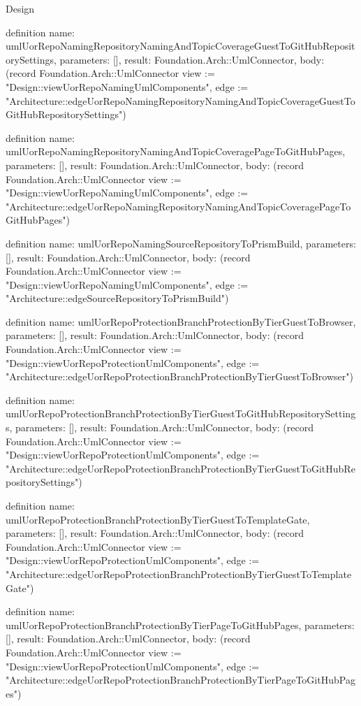 \begin{lexlean}{Design}
\begin{semanticmodule}
definition{
  name: umlUorRepoNamingRepositoryNamingAndTopicCoverageGuestToGitHubRepositorySettings,
  parameters: [],
  result: Foundation.Arch::UmlConnector,
  body: (record Foundation.Arch::UmlConnector {view := "Design::viewUorRepoNamingUmlComponents", edge := "Architecture::edgeUorRepoNamingRepositoryNamingAndTopicCoverageGuestToGitHubRepositorySettings"})
}

definition{
  name: umlUorRepoNamingRepositoryNamingAndTopicCoveragePageToGitHubPages,
  parameters: [],
  result: Foundation.Arch::UmlConnector,
  body: (record Foundation.Arch::UmlConnector {view := "Design::viewUorRepoNamingUmlComponents", edge := "Architecture::edgeUorRepoNamingRepositoryNamingAndTopicCoveragePageToGitHubPages"})
}

definition{
  name: umlUorRepoNamingSourceRepositoryToPrismBuild,
  parameters: [],
  result: Foundation.Arch::UmlConnector,
  body: (record Foundation.Arch::UmlConnector {view := "Design::viewUorRepoNamingUmlComponents", edge := "Architecture::edgeSourceRepositoryToPrismBuild"})
}

definition{
  name: umlUorRepoProtectionBranchProtectionByTierGuestToBrowser,
  parameters: [],
  result: Foundation.Arch::UmlConnector,
  body: (record Foundation.Arch::UmlConnector {view := "Design::viewUorRepoProtectionUmlComponents", edge := "Architecture::edgeUorRepoProtectionBranchProtectionByTierGuestToBrowser"})
}

definition{
  name: umlUorRepoProtectionBranchProtectionByTierGuestToGitHubRepositorySettings,
  parameters: [],
  result: Foundation.Arch::UmlConnector,
  body: (record Foundation.Arch::UmlConnector {view := "Design::viewUorRepoProtectionUmlComponents", edge := "Architecture::edgeUorRepoProtectionBranchProtectionByTierGuestToGitHubRepositorySettings"})
}

definition{
  name: umlUorRepoProtectionBranchProtectionByTierGuestToTemplateGate,
  parameters: [],
  result: Foundation.Arch::UmlConnector,
  body: (record Foundation.Arch::UmlConnector {view := "Design::viewUorRepoProtectionUmlComponents", edge := "Architecture::edgeUorRepoProtectionBranchProtectionByTierGuestToTemplateGate"})
}

definition{
  name: umlUorRepoProtectionBranchProtectionByTierPageToGitHubPages,
  parameters: [],
  result: Foundation.Arch::UmlConnector,
  body: (record Foundation.Arch::UmlConnector {view := "Design::viewUorRepoProtectionUmlComponents", edge := "Architecture::edgeUorRepoProtectionBranchProtectionByTierPageToGitHubPages"})
}


\end{semanticmodule}
\end{lexlean}
